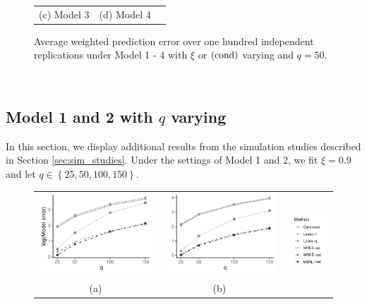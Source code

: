 \documentclass[12pt]{article}
\begin{document}
\begin{figure}[t!]
\begin{tabular}{ccc}
(c) Model 3  & (d) Model 4 & \\[6pt]
\end{tabular}
\caption{Average weighted prediction error over one hundred independent replications under Model 1 - 4 with $\xi$ or $(\rm cond)$ varying and $q=50$.}\label{fig:predErr_Results}
\end{figure} \


\subsection{Model 1 and 2 with $q$ varying}
In this section, we display additional results from the simulation studies described in Section \ref{sec:sim_studies}. Under the settings of Model 1 and 2, we fit $\xi = 0.9$ and let $q \in \left\{25, 50, 100, 150\right\}$. 
\begin{figure}[t!]
\begin{tabular}{ccc}
\includegraphics[width=6.5cm]{Plots/NormalHet_qAR1_ModelErr_April.pdf} &   \includegraphics[width=6.5cm]{Plots/NormalHet_qConst_ModelErr_April.pdf} & \multirow{4}{*}{\includegraphics[width=2.5cm]{Plots/Vert_Legend.pdf}} \\
(a)  & (b)  & \\[6pt]

\end{tabular}
\end{figure}
\end{document}
